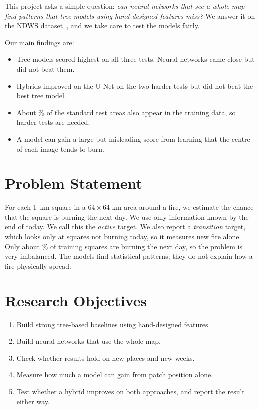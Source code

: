 \documentclass[conference]{IEEEtran}
\begin{document}
This project asks a simple question: \emph{can neural networks that see a whole map find patterns that tree models using hand-designed features miss?} We answer it on the NDWS dataset~\cite{huot2022ndws}, and we take care to test the models fairly.

Our main findings are:
\begin{itemize}
\item Tree models scored highest on all three tests. Neural networks came close but did not beat them.
\item Hybrids improved on the U-Net on the two harder tests but did not beat the best tree model.
\item About \rOfficialOverlap\% of the standard test areas also appear in the training data, so harder tests are needed.
\item A model can gain a large but misleading score from learning that the centre of each image tends to burn.
\end{itemize}

\section{Problem Statement}
For each \SI{1}{km} square in a $64\times64$ km area around a fire, we estimate the chance that the square is burning the next day. We use only information known by the end of today. We call this the \emph{active} target. We also report a \emph{transition} target, which looks only at squares not burning today, so it measures new fire alone. Only about \rTrainPositiveRate\% of training squares are burning the next day, so the problem is very imbalanced. The models find statistical patterns; they do not explain how a fire physically spread.

\section{Research Objectives}
\begin{enumerate}
\item Build strong tree-based baselines using hand-designed features.
\item Build neural networks that use the whole map.
\item Check whether results hold on new places and new weeks.
\item Measure how much a model can gain from patch position alone.
\item Test whether a hybrid improves on both approaches, and report the result either way.
\end{enumerate}
\end{document}
